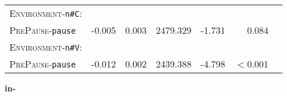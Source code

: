 \begin{table}[H]
\begin{center}
{\begin{tabular} {lrrrrrr}
		\textsc{Environment}-\texttt{n\#C}:&&&&&\\
		\textsc{PrePause}-\texttt{pause }&  \color[HTML]{9B9B9B}-0.005& \color[HTML]{9B9B9B}0.003& \color[HTML]{9B9B9B}2479.329 &\color[HTML]{9B9B9B} -1.731& \color[HTML]{9B9B9B}0.084 \\ 
		
		\textsc{Environment}-\texttt{n\#V}:&&&&&\\
		\textsc{PrePause}-\texttt{pause} & -0.012 & 0.002& 2439.388& -4.798& $<$0.001 \\ 
		
		\hline
			\end{tabular}
}
\end{center}

\end{table}

\vspace*{-0.6cm}
\textbf{{in-}}

\vspace*{-0.3cm}

